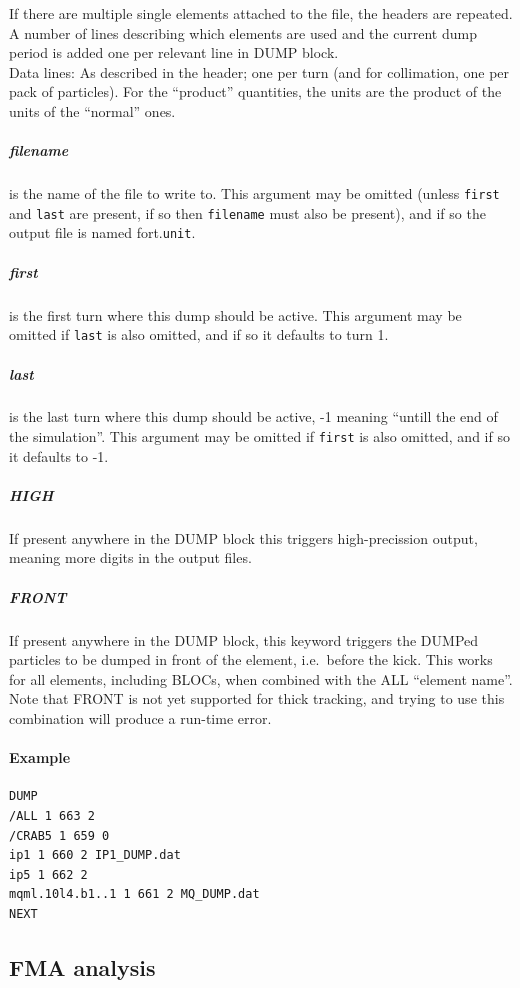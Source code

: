 \begin{enumerate}
	If there are multiple single elements attached to the file, the headers are repeated.\\
	A number of lines describing which elements are used and the current dump period is added one per relevant line in DUMP block.\\
	Data lines: As described in the header; one per turn (and for collimation, one per pack of particles).
	For the ``product'' quantities, the units are the product of the units of the ``normal'' ones.
\end{enumerate}

\subparagraph{filename} is the name of the file to write to. This argument may be omitted (unless \texttt{first} and \texttt{last} are present, if so then \texttt{filename} must also be present), and if so the output file is named fort.\texttt{unit}.

\subparagraph{first} is the first turn where this dump should be active. This argument may be omitted if \texttt{last} is also omitted, and if so it defaults to turn 1.

\subparagraph{last} is the last turn where this dump should be active, -1 meaning ``untill the end of the simulation''. This argument may be omitted if \texttt{first} is also omitted, and if so it defaults to -1.

\subparagraph{HIGH} If present anywhere in the DUMP block this triggers high-precission output, meaning more digits in the output files.

\subparagraph{FRONT} If present anywhere in the DUMP block, this keyword triggers the DUMPed particles to be dumped in front of the element, i.e.\ before the kick.
This works for all elements, including BLOCs, when combined with the ALL ``element name''.
Note that FRONT is not yet supported for thick tracking, and trying to use this combination will produce a run-time error.

\paragraph{Example}
\begin{verbatim}
DUMP
/ALL 1 663 2
/CRAB5 1 659 0
ip1 1 660 2 IP1_DUMP.dat
ip5 1 662 2
mqml.10l4.b1..1 1 661 2 MQ_DUMP.dat
NEXT
\end{verbatim}

\subsection{FMA analysis}
\label{sec:FMA}

